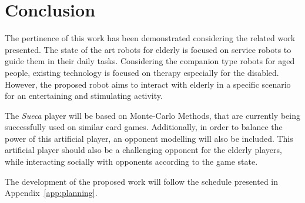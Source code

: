 \section{Conclusion} \label{sec:conclusion}

The pertinence of this work has been demonstrated considering the related work presented.
The state of the art robots for elderly is focused on service robots to guide them in their daily tasks.
Considering the companion type robots for aged people, existing technology is focused on therapy especially for the disabled.
However, the proposed robot aims to interact with elderly in a specific scenario for an entertaining and stimulating activity.

The \emph{Sueca} player will be based on Monte-Carlo Methods, that are currently being successfully used on similar card games.
Additionally, in order to balance the power of this artificial player, an opponent modelling will also be included.
This artificial player should also be a challenging opponent for the elderly players, while interacting socially with opponents according to the game state.


The development of the proposed work will follow the schedule presented in Appendix~\ref{app:planning}.

